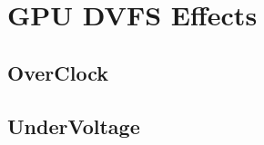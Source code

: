 \section{GPU DVFS Effects}
\label{section:dvfseffects}

\subsection{OverClock}
\label{section:underclock}

\subsection{UnderVoltage}




